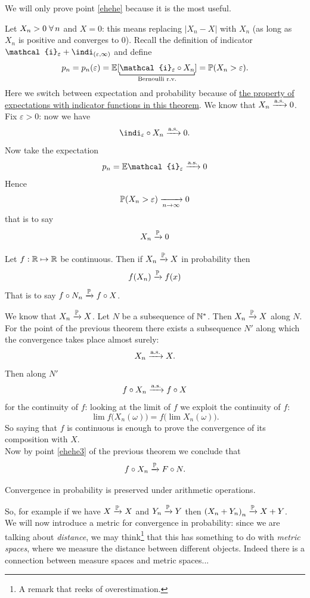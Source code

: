\documentclass{report}
\begin{document}
We will only prove point \ref{ehehe} because it is the most useful.
\begin{fancyproof}
	Let $X_n>0\;\forall\, n$ and $X=0$: this means replacing $|X_n-X|$ with $X_n$ (as long as $X_n$ is positive and converges to 0). Recall the definition of indicator $\mathcal{i}_\varepsilon+\indi_{(\varepsilon,\infty)}$ and define
	\[p_n=p_n(\varepsilon)=\ev[\underbracket[0.6pt]{\mathcal{i}_\varepsilon\circ X_n}_{\mathclap{\text{Bernoulli r.v.}}}]=\pr(X_n>\varepsilon).\]
	Here we switch between expectation and probability because of \hyperref[expprob]{the property of expectations with indicator functions in this theorem}. We know that $X_n\xrightarrow[]{\text{a.s.}} 0$. Fix $\varepsilon>0$: now we have
	\[\indi_\varepsilon\circ X_n\convas0.\] Now take the expectation
	\[p_n=\ev\mathcal{i}_{\varepsilon}\convas0\]
	Hence
	\[\mathbb{P}(X_n>\varepsilon)\xrightarrow[n\to\infty]{}0\]
	that is to say
	\[X_n\xrightarrow[]{\mathbb{P}}0\]
\end{fancyproof}
\begin{proposition}
	Let $f:\mathbb{R}\mapsto\mathbb{R}$ be continuous. Then if $X_n\xrightarrow[]{\mathbb{P}} X$ in probability then
	\[f(X_n)\xrightarrow[]{\mathbb{P}} f(x)\]
	That is to say $f\circ N_n\xrightarrow[]{\mathbb{P}} f\circ X$.
\end{proposition}
\begin{fancyproof}
	We know that $X_n\xrightarrow[]{\mathbb{P}} X$. Let $N$ be a subsequence of $\mathbb{N}^{*}$. Then $X_n\xrightarrow[]{\mathbb{P}} X$ along $N$. For the point  of the previous theorem there exists a subsequence $N'$ along which the convergence takes place almost surely:
	\[X_n\xrightarrow[]{\text{a.s.}} X.\]
	Then along $N'$
	\[f\circ X_n\xrightarrow[]{\text{a.s.}} f\circ X\]
	for the continuity of $f$: looking at the limit of $f$ we exploit the continuity of $f$:
	\[\lim f\Big(X_n(\omega)\Big)=f\Big(\lim X_n(\omega)\Big).\] So saying that $f$ is continuous is enough to prove the convergence of its composition with $X$.\\
	Now by point \ref{ehehe3} of the previous theorem we conclude that 
	\[f\circ X_n\xrightarrow[]{\mathbb{P}} F\circ N.\]
\end{fancyproof}
\begin{remark}
Convergence in probability is preserved under arithmetic operations. 
\end{remark}
So, for example if we have $X\xrightarrow[]{\mathbb{P}} X$ and $Y_n\xrightarrow[]{\mathbb{P}} Y$ then ${(X_n+Y_n)}_{n}\xrightarrow[]{\mathbb{P}} X+Y$.\\
We will now introduce a metric for convergence in probability: since we are talking about \textit{distance}, we may think\footnote{A remark that reeks of overestimation.} that this has something to do with \textit{metric spaces}, where we measure the distance between different objects. Indeed there is a connection between measure spaces and metric spaces...\par
\end{document}
